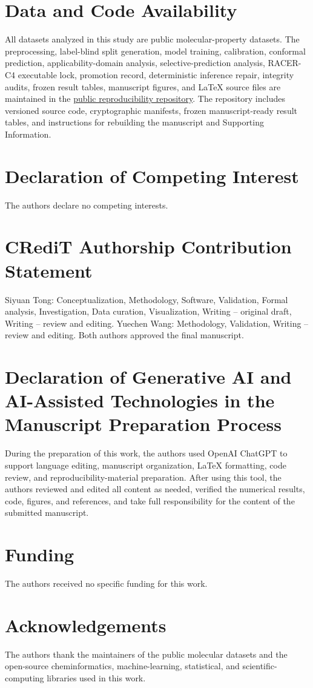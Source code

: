 \section*{Data and Code Availability}

All datasets analyzed in this study are public molecular-property datasets. The preprocessing, label-blind split generation, model training, calibration, conformal prediction, applicability-domain analysis, selective-prediction analysis, RACER-C4 executable lock, promotion record, deterministic inference repair, integrity audits, frozen result tables, manuscript figures, and LaTeX source files are maintained in the \href{https://github.com/DCarchimonde/aidd-paper-factory}{public reproducibility repository}. The repository includes versioned source code, cryptographic manifests, frozen manuscript-ready result tables, and instructions for rebuilding the manuscript and Supporting Information.

\section*{Declaration of Competing Interest}

The authors declare no competing interests.

\section*{CRediT Authorship Contribution Statement}

Siyuan Tong: Conceptualization, Methodology, Software, Validation, Formal analysis, Investigation, Data curation, Visualization, Writing -- original draft, Writing -- review and editing. Yuechen Wang: Methodology, Validation, Writing -- review and editing. Both authors approved the final manuscript.

\section*{Declaration of Generative AI and AI-Assisted Technologies in the Manuscript Preparation Process}

During the preparation of this work, the authors used OpenAI ChatGPT to support language editing, manuscript organization, LaTeX formatting, code review, and reproducibility-material preparation. After using this tool, the authors reviewed and edited all content as needed, verified the numerical results, code, figures, and references, and take full responsibility for the content of the submitted manuscript.

\section*{Funding}

The authors received no specific funding for this work.

\section*{Acknowledgements}

The authors thank the maintainers of the public molecular datasets and the open-source cheminformatics, machine-learning, statistical, and scientific-computing libraries used in this work.
